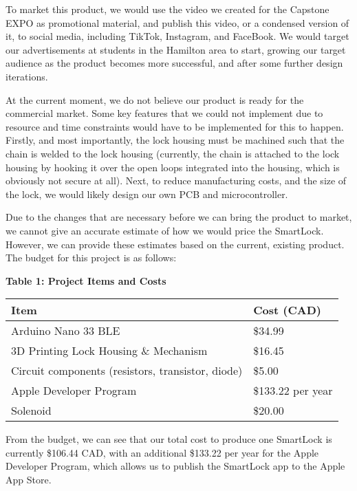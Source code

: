 \documentclass{article}
\begin{document}
To market this product, we would use the video we created for the Capstone EXPO as promotional material, and publish this video, or a condensed version of it, to social media, including TikTok, Instagram, and FaceBook. We would target our advertisements at students in the Hamilton area to start, growing our target audience as the product becomes more successful, and after some further design iterations.

At the current moment, we do not believe our product is ready for the commercial market. Some key features that we could not implement due to resource and time constraints would have to be implemented for this to happen. Firstly, and most importantly, the lock housing must be machined such that the chain is welded to the lock housing (currently, the chain is attached to the lock housing by hooking it over the open loops integrated into the housing, which is obviously not secure at all). Next, to reduce manufacturing costs, and the size of the lock, we would likely design our own PCB and microcontroller. 

Due to the changes that are necessary before we can bring the product to market, we cannot give an accurate estimate of how we would price the SmartLock. However, we can provide these estimates based on the current, existing product. The budget for this project is as follows:

\vspace{0.5cm}
\begin{center}
\textbf{Table 1: Project Items and Costs}
\begin{tabular}{|l|l|}
    \hline
   \textbf{Item}  & \textbf{Cost (CAD)} \\
   \hline
    Arduino Nano 33 BLE & \$34.99 \\
    \hline
    3D Printing Lock Housing \& Mechanism & \$16.45 \\
    \hline
    Circuit components (resistors, transistor, diode) & \$5.00 \\
    \hline
    Apple Developer Program & \$133.22 per year \\
    \hline
    Solenoid & \$20.00 \\
    \hline
\end{tabular}
\end{center}

From the budget, we can see that our total cost to produce one SmartLock is currently \$106.44 CAD, with an additional \$133.22 per year for the Apple Developer Program, which allows us to publish the SmartLock app to the Apple App Store. 
\end{document}
